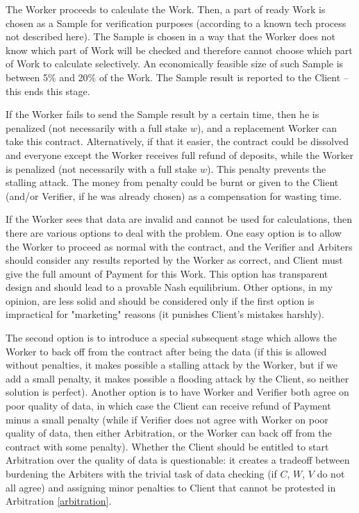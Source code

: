 \documentclass{article}
\begin{document}
The Worker proceeds to calculate the Work. Then, a part of ready Work is chosen as a Sample for verification purposes (according to a known tech process not described here). The Sample is chosen in a way that the Worker does not know which part of Work will be checked and therefore cannot choose which part of Work to calculate selectively. An economically feasible size of such Sample is between 5\% and 20\% of the Work. The Sample result is reported to the Client – this ends this stage.

If the Worker fails to send the Sample result by a certain time, then he is penalized (not necessarily with a full stake $w$), and a replacement Worker can take this contract. Alternatively, if that it easier, the contract could be dissolved and everyone except the Worker receives full refund of deposits, while the Worker is penalized (not necessarily with a full stake $w$). This penalty prevents the stalling attack. The money from penalty could be burnt or given to the Client (and/or Verifier, if he was already chosen) as a compensation for wasting time.

If the Worker sees that data are invalid and cannot be used for calculations, then there are various options to deal with the problem. One easy option is to allow the Worker to proceed as normal with the contract, and the Verifier and Arbiters should consider any results reported by the Worker as correct, and Client must give the full amount of Payment for this Work. This option has transparent design and should lead to a provable Nash equilibrium. Other options, in my opinion, are less solid and should be considered only if the first option is impractical for "marketing" reasons (it punishes Client's mistakes harshly).

The second option is to introduce a special subsequent stage which allows the Worker to back off from the contract after being the data (if this is allowed without penalties, it makes possible a stalling attack by the Worker, but if we add a small penalty, it makes possible a flooding attack by the Client, so neither solution is perfect). Another option is to have Worker and Verifier both agree on poor quality of data, in which case the Client can receive refund of Payment minus a small penalty (while if Verifier does not agree with Worker on poor quality of data, then either Arbitration, or the Worker can back off from the contract with some penalty). Whether the Client should be entitled to start Arbitration over the quality of data is questionable: it creates a tradeoff between burdening the Arbiters with the trivial task of data checking (if $C$, $W$, $V$ do not all agree) and assigning minor penalties to Client that cannot be protested in Arbitration \ref{arbitration}.
\end{document}
